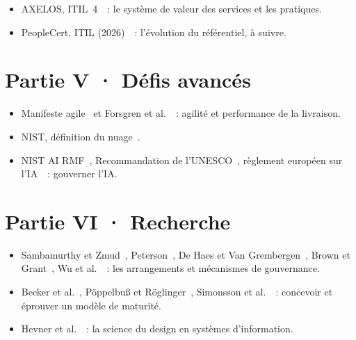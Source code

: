 \begin{itemize}
    \item AXELOS, ITIL~4~\cite{axelos2019itil4}~: le système de valeur des
          services et les pratiques.
    \item PeopleCert, ITIL (2026)~\cite{peoplecert2026itil5}~: l'évolution
          du référentiel, à suivre.
\end{itemize}

\section*{Partie V · Défis avancés}

\begin{itemize}
    \item Manifeste agile~\cite{agile2001manifeste} et Forsgren et
          al.~\cite{forsgren2018accelerate}~: agilité et performance de la
          livraison.
    \item NIST, définition du nuage~\cite{nist2011cloud}.
    \item NIST AI RMF~\cite{nist2023airmf}, Recommandation de
          l'UNESCO~\cite{unesco2021ethique}, règlement européen sur
          l'IA~\cite{ue2024aiact}~: gouverner l'IA.
\end{itemize}

\section*{Partie VI · Recherche}

\begin{itemize}
    \item Sambamurthy et Zmud~\cite{sambamurthy1999arrangements}, Peterson~\cite{peterson2004crafting},
          De Haes et Van Grembergen~\cite{dehaes2009exploratory}, Brown et
          Grant~\cite{brown2005framing}, Wu et al.~\cite{wu2015mechanisms}~:
          les arrangements et mécanismes de gouvernance.
    \item Becker et al.~\cite{becker2009maturity}, Pöppelbuß et
          Röglinger~\cite{poppelbuss2011maturity}, Simonsson et
          al.~\cite{simonsson2010maturity}~: concevoir et éprouver un modèle
          de maturité.
    \item Hevner et al.~\cite{hevner2004design}~: la science du design en
          systèmes d'information.
\end{itemize}
